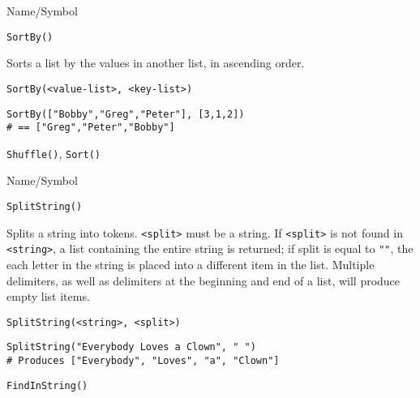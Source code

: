 \rl


\begin{desc}{Name/Symbol}
\item[Name/Symbol] 	\verb+SortBy()+

\item[Description] 	Sorts a list by the values in another list, in ascending
		order.

\item[Usage]
\begin{verbatim}
SortBy(<value-list>, <key-list>)
\end{verbatim}

\item[Example]
\begin{verbatim}
SortBy(["Bobby","Greg","Peter"], [3,1,2]) 
# == ["Greg","Peter","Bobby"]
\end{verbatim}

\item[See Also]    	\verb+Shuffle()+, \verb+Sort()+
\end{desc}

\rl


\begin{desc}{Name/Symbol}
\item[Name/Symbol]  	\verb+SplitString()+

\item[Description]	Splits a string into tokens. \verb+<split>+ must be a string. If 
		\verb+<split>+ is not found in \verb+<string>+, a list containing the entire 
		string is returned; if split is equal to \verb+""+, the each letter 
		in the string is placed into a different item in the list.  
		Multiple delimiters, as well as delimiters at the beginning 
		and end of a list, will produce empty list items. 


\item[Usage]
\begin{verbatim}
SplitString(<string>, <split>)
\end{verbatim}

\item[Example]      	
\begin{verbatim}
SplitString("Everybody Loves a Clown", " ") 
# Produces ["Everybody", "Loves", "a", "Clown"]
\end{verbatim}

\item[See Also]     	\verb+FindInString()+
\end{desc}

\rl




